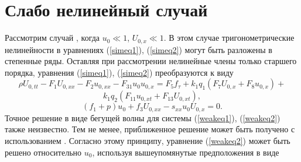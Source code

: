 \section{Слабо нелинейный случай}

Рассмотрим случай , когда $u_0 \ll 1$, $U_{0, x} \ll 1$. В этом случае тригонометрические нелинейности в уравнениях (\ref{simeq1}), (\ref{simeq2}) могут быть разложены в степенные ряды. Оставляя при рассмотрении нелинейные члены только старшего порядка, уравнения (\ref{simeq1}), (\ref{simeq2}) преобразуются к виду
\[
\rho U_{0,tt}- F_1 U_{0,xx}- F_2 u_{0,xx}-F_{31} u_0 u_{0,x}=F_5 f_\tau+k_1 q_1 (F_7 U_{0,x}+F_8 u_{0,x})+
\]
\begin{equation}
	k_1 q_2 (F_{11} u_{0,xt}+ F_{13} U_{0,xt}) , \label{weakeq1}
\end{equation}
\begin{equation}
	(f_1+p)u_0+f_3 U_{0,xx}-s_{xx} u_0 U_{0,x}=0. \label{weakeq2}
\end{equation}
Точное решение в виде бегущей волны для системы (\ref{weakeq1}), (\ref{weakeq2}) также неизвестно. Тем не менее, приближенное решение может быть получено с использованием  \cite{bound_porpas}. Согласно этому принципу, уравнение (\ref{weakeq2}) может быть решено относительно $u_0$, используя вышеупомянутые предположения в виде
